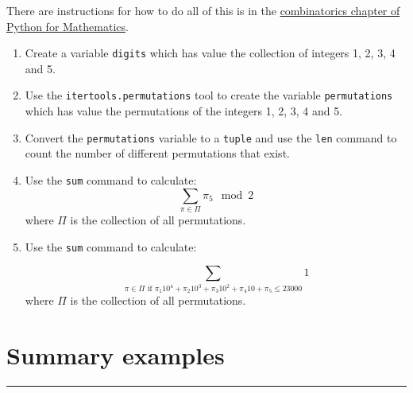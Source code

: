\documentclass{article}
\begin{document}
There are instructions for how to do all of this is in the
\href{https://vknight.org/pfm/tools-for-mathematics/05-combinations-permutations/how/main.html}{combinatorics chapter of Python for Mathematics}.


\begin{enumerate}
    \item Create a variable \texttt{digits} which has value the
        collection of integers 1, 2, 3, 4 and 5.
\item
    Use the \texttt{itertools.permutations} tool to create the
        variable \texttt{permutations} which has value the
        permutations of the integers 1, 2, 3, 4 and 5. 
    \item Convert the \texttt{permutations} variable to a
        \texttt{tuple} and use the \texttt{len} command
        to count the number of different permutations that exist.
    \item Use the \texttt{sum} command to calculate:
        \[\sum_{\pi \in \Pi}\pi_5\mod 2\] where $\Pi$ is the collection of all
        permutations. 
    \item Use the \texttt{sum} command to calculate:

        \[\sum_{\pi \in \Pi \text{ if }\pi_1 10 ^ 4 + \pi_2 10 ^ 3 + \pi_3 10 ^ 2 + \pi_4 10 + \pi_5 \leq 23000} 1 \] 
        where $\Pi$ is the collection of all
        permutations. 
\end{enumerate}

\section{Summary examples}
\hrule
\end{document}
